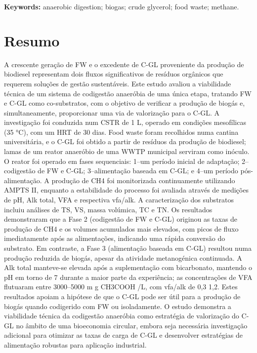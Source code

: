 \documentclass[12pt, a4paper, oneside]{report}
\begin{document}
\vspace{1em}
\noindent\textbf{Keywords:} anaerobic digestion; biogas; crude glycerol; food waste; methane.
\clearpage{}

\begingroup
  \clearpage{}\chapter*{Resumo}

A crescente geração de FW e o excedente de C-GL proveniente da produção de biodiesel representam dois fluxos significativos de resíduos orgânicos que requerem soluções de gestão sustentáveis. Este estudo avaliou a viabilidade técnica de um sistema de codigestão anaeróbia de uma única etapa, tratando FW e C-GL como co-substratos, com o objetivo de verificar a produção de biogás e, simultaneamente, proporcionar uma via de valorização para o C-GL. A investigação foi conduzida num CSTR de 1 L, operado em condições mesofílicas (35 °C), com um HRT de 30 dias. Food waste foram recolhidos numa cantina universitária, e o C-GL foi obtido a partir de resíduos da produção de biodiesel; lamas de um reator anaeróbio de uma WWTP municipal serviram como inóculo. O reator foi operado em fases sequenciais: 1–um período inicial de adaptação; 2–codigestão de FW e C-GL; 3–alimentação baseada em C-GL; e 4–um período pós-alimentação. A produção de CH4 foi monitorizada continuamente utilizando AMPTS II, enquanto a estabilidade do processo foi avaliada através de medições de pH, Alk total, VFA e respectiva vfa/alk. A caracterização dos substratos incluiu análises de TS, VS, massa volúmica, TC e TN. Os resultados demonstraram que a Fase 2 (codigestão de FW e C-GL) originou as taxas de produção de CH4 e os volumes acumulados mais elevados, com picos de fluxo imediatamente após as alimentações, indicando uma rápida conversão do substrato. Em contraste, a Fase 3 (alimentação baseada em C-GL) resultou numa produção reduzida de biogás, apesar da atividade metanogénica continuada. A Alk total manteve-se elevada após a suplementação com bicarbonato, mantendo o pH em torno de 7 durante a maior parte da experiência; as concentrações de VFA flutuaram entre 3000–5000 m g CH3COOH /L, com vfa/alk de 0,3 1,2. Estes resultados apoiam a hipótese de que o C-GL pode ser útil para a produção de biogás quando codigerido com FW ou isoladamente. O estudo demonstra a viabilidade técnica da codigestão anaeróbia como estratégia de valorização do C-GL no âmbito de uma bioeconomia circular, embora seja necessária investigação adicional para otimizar as taxas de carga de C-GL e desenvolver estratégias de alimentação robustas para aplicação industrial.
\end{document}
